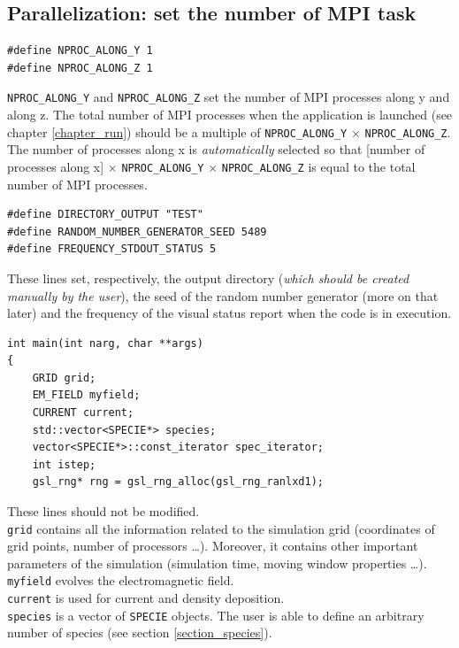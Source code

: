 \documentclass[11pt,a4paper]{report}
\begin{document}
\subsection*{Parallelization: set the number of MPI task}
\begin{lstlisting}
#define NPROC_ALONG_Y 1
#define NPROC_ALONG_Z 1
\end{lstlisting}
\verb+NPROC_ALONG_Y+ and \verb+NPROC_ALONG_Z+ set the number of MPI processes along y and along z. 
The total number of MPI processes when the application is launched (see chapter \ref{chapter_run}) should be a multiple of \verb+NPROC_ALONG_Y+ $\times$ \verb+NPROC_ALONG_Z+. The number of processes along x is \emph{automatically} selected so that [number of processes along x] $\times$ \verb+NPROC_ALONG_Y+ $\times$ \verb+NPROC_ALONG_Z+ is equal to the total number of MPI processes.
\begin{lstlisting}
#define DIRECTORY_OUTPUT "TEST"
#define RANDOM_NUMBER_GENERATOR_SEED 5489
#define FREQUENCY_STDOUT_STATUS 5
\end{lstlisting}
These lines set, respectively, the output directory (\emph{which should be created manually by the user}), the seed of the random number generator (more on that later) and the frequency of the visual status report when the code is in execution.
\begin{lstlisting}[backgroundcolor=\color{no_modify}]
int main(int narg, char **args)
{
	GRID grid;
	EM_FIELD myfield;
	CURRENT current;
	std::vector<SPECIE*> species;
	vector<SPECIE*>::const_iterator spec_iterator;
	int istep;
	gsl_rng* rng = gsl_rng_alloc(gsl_rng_ranlxd1);
\end{lstlisting}
These lines should not be modified. \\
\verb+grid+ contains all the information related to the simulation grid (coordinates of grid points, number of processors \ldots). Moreover, it contains other important parameters of the simulation (simulation time, moving window properties \ldots).\\
\verb+myfield+ evolves the electromagnetic field.\\
\verb+current+ is used for current and density deposition.\\
\verb+species+ is a vector of \verb+SPECIE+ objects. The user is able to define an arbitrary number of species (see section \ref{section_species}).
\end{document}
